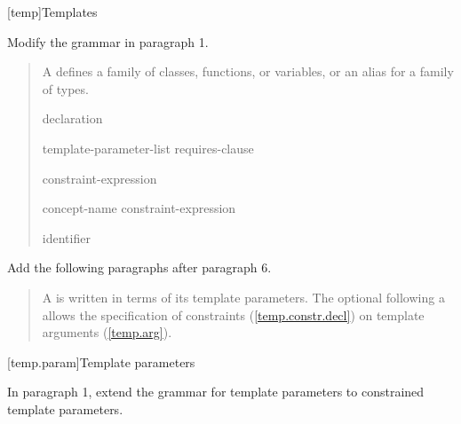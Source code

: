 
\setcounter{chapter}{16}
[temp]{Templates}

Modify the  grammar in paragraph 1.

\begin{quote}
\pnum
A  defines a family of classes, functions, or variables, or an alias for a
family of types.

\begin{bnf}
\br
    declaration\br

\begin{addedblock}
\br
   \terminal{<} template-parameter-list \terminal{>} requires-clause\opt
\end{addedblock}

\begin{addedblock}
\br
   constraint-expression

\br
   concept-name \terminal{=} constraint-expression

\br
  identifier
\end{addedblock}
\end{bnf}
\end{quote}
  
Add the following paragraphs after paragraph 6.

\begin{quote}
\begin{addedblock}
\setcounter{Paras}{6}
\pnum
A  is written in terms of its template 
parameters. 
%
The optional  following a
 allows the specification of
constraints (\ref{temp.constr.decl}) on template arguments (\ref{temp.arg}).
\end{addedblock}
\end{quote}


[temp.param]{Template parameters}

In paragraph 1, extend the grammar for template parameters to 
constrained template parameters.

